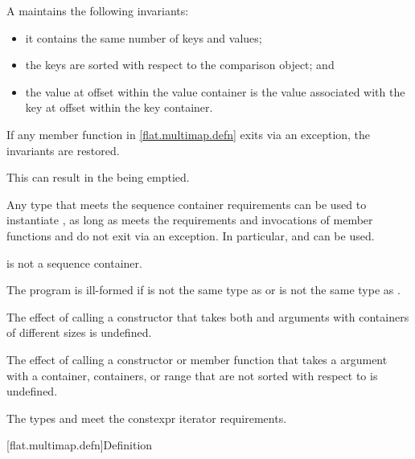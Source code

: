 \pnum
A  maintains the following invariants:
\begin{itemize}
\item
it contains the same number of keys and values;
\item
the keys are sorted with respect to the comparison object; and
\item
the value at offset  within the value container is the value
associated with the key at offset  within the key container.
\end{itemize}

\pnum
If any member function in \ref{flat.multimap.defn} exits via an exception,
the invariants are restored.
\begin{note}
This can result in the  being emptied.
\end{note}

\pnum
Any type 
that meets the sequence container requirements
can be used to instantiate ,
as long as
 meets the  requirements and
invocations of
member functions  and  do not exit via an exception.
In particular,
 and  can be used.
\begin{note}
 is not a sequence container.
\end{note}

\pnum
The program is ill-formed if
 is not the same type as  or
 is not the same type as .

\pnum
The effect of calling a constructor
that takes both  and
 arguments
with containers of different sizes is undefined.

\pnum
The effect of calling a constructor or member function
that takes a  argument
with a container, containers, or range
that are not sorted with respect to  is undefined.

\pnum
The types  and  meet
the constexpr iterator requirements.

[flat.multimap.defn]{Definition}

